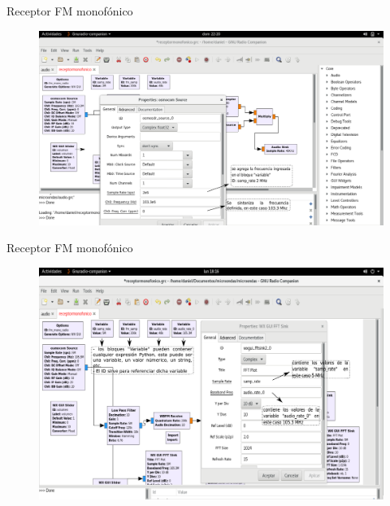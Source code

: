 \begin{frame}{Receptor FM monofónico}

\begin{figure}[H]
\centering
\vspace{-3mm}
\includegraphics[width=\textwidth]{parte3/lab8/pdf/lab8_2.pdf}
\end{figure}

\end{frame}

\begin{frame}{Receptor FM monofónico}

\begin{figure}[H]
\centering
\vspace{-3mm}
\includegraphics[width=\textwidth]{parte3/lab8/pdf/lab8_3.pdf}
\end{figure}

\end{frame}

